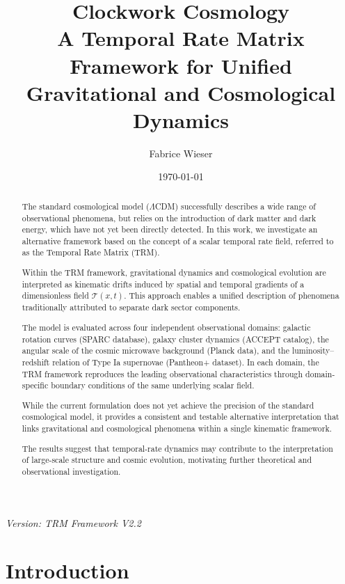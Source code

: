 \documentclass[11pt]{article}
\title{Clockwork Cosmology\\
	\large A Temporal Rate Matrix Framework for Unified Gravitational and Cosmological Dynamics}
\author{Fabrice Wieser}
\date{\today}
\begin{document}
	\maketitle
	\vspace{-1em}
	\begin{center}
		\textit{Version: TRM Framework V2.2}
	\end{center}
\begin{abstract}
	The standard cosmological model ($\Lambda$CDM) successfully describes a wide range of observational phenomena, but relies on the introduction of dark matter and dark energy, which have not yet been directly detected. In this work, we investigate an alternative framework based on the concept of a scalar temporal rate field, referred to as the Temporal Rate Matrix (TRM).

	Within the TRM framework, gravitational dynamics and cosmological evolution are interpreted as kinematic drifts induced by spatial and temporal gradients of a dimensionless field $\mathcal{T}(x,t)$. This approach enables a unified description of phenomena traditionally attributed to separate dark sector components.

	The model is evaluated across four independent observational domains: galactic rotation curves (SPARC database), galaxy cluster dynamics (ACCEPT catalog), the angular scale of the cosmic microwave background (Planck data), and the luminosity--redshift relation of Type Ia supernovae (Pantheon+ dataset). In each domain, the TRM framework reproduces the leading observational characteristics through domain-specific boundary conditions of the same underlying scalar field.

	While the current formulation does not yet achieve the precision of the standard cosmological model, it provides a consistent and testable alternative interpretation that links gravitational and cosmological phenomena within a single kinematic framework.

	The results suggest that temporal-rate dynamics may contribute to the interpretation of large-scale structure and cosmic evolution, motivating further theoretical and observational investigation.
\end{abstract}

	\section{Introduction}
\end{document}

